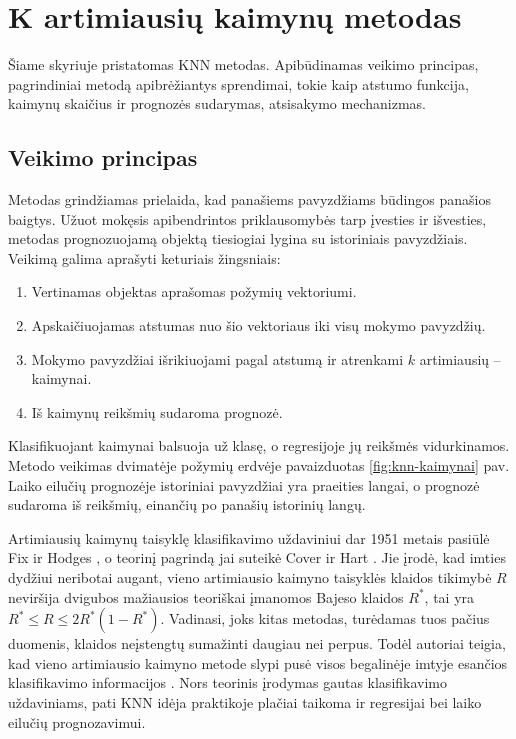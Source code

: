 

\section{K artimiausių kaimynų metodas}

Šiame skyriuje pristatomas KNN metodas.
Apibūdinamas veikimo principas, pagrindiniai metodą apibrėžiantys sprendimai, tokie kaip atstumo funkcija, kaimynų skaičius ir prognozės sudarymas, atsisakymo mechanizmas.


\subsection{Veikimo principas}

Metodas grindžiamas prielaida, kad panašiems pavyzdžiams būdingos panašios baigtys.
Užuot mokęsis apibendrintos priklausomybės tarp įvesties ir išvesties, metodas prognozuojamą objektą tiesiogiai lygina su istoriniais pavyzdžiais.
Veikimą galima aprašyti keturiais žingsniais:
\begin{enumerate}
    \item Vertinamas objektas aprašomas požymių vektoriumi.
    \item Apskaičiuojamas atstumas nuo šio vektoriaus iki visų mokymo pavyzdžių.
    \item Mokymo pavyzdžiai išrikiuojami pagal atstumą ir atrenkami $k$ artimiausių -- kaimynai.
    \item Iš kaimynų reikšmių sudaroma prognozė.
\end{enumerate}
Klasifikuojant kaimynai balsuoja už klasę, o regresijoje jų reikšmės vidurkinamos.
Metodo veikimas dvimatėje požymių erdvėje pavaizduotas \ref{fig:knn-kaimynai} pav.
Laiko eilučių prognozėje istoriniai pavyzdžiai yra praeities langai, o prognozė sudaroma iš reikšmių, einančių po panašių istorinių langų.



Artimiausių kaimynų taisyklę klasifikavimo uždaviniui dar 1951 metais pasiūlė Fix ir Hodges \cite{fix1951}, o teorinį pagrindą jai suteikė Cover ir Hart \cite{cover1967}.
Jie įrodė, kad imties dydžiui neribotai augant, vieno artimiausio kaimyno taisyklės klaidos tikimybė $R$ neviršija dvigubos mažiausios teoriškai įmanomos Bajeso klaidos $R^*$, tai yra $R^* \le R \le 2R^*(1-R^*)$.
Vadinasi, joks kitas metodas, turėdamas tuos pačius duomenis, klaidos neįstengtų sumažinti daugiau nei perpus.
Todėl autoriai teigia, kad vieno artimiausio kaimyno metode slypi pusė visos begalinėje imtyje esančios klasifikavimo informacijos \cite{cover1967}.
Nors teorinis įrodymas gautas klasifikavimo uždaviniams, pati KNN idėja praktikoje plačiai taikoma ir regresijai bei laiko eilučių prognozavimui.

